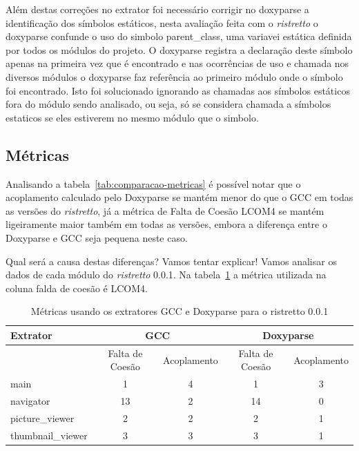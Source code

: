 Além destas correções no extrator foi necessário corrigir no doxyparse a
identificação dos símbolos estáticos, nesta avaliação feita com o {\it ristretto} o
doxyparse confunde o uso do simbolo parent\_class, uma variavei estática
definida por todos os módulos do projeto. O doxyparse registra a declaração
deste símbolo apenas na primeira vez que é encontrado e nas ocorrências de uso
e chamada nos diversos módulos o doxyparse faz referência ao primeiro módulo
onde o símbolo foi encontrado. Isto foi solucionado ignorando as chamadas aos
símbolos estáticos fora do módulo sendo analisado, ou seja, só se considera
chamada a símbolos estaticos se eles estiverem no mesmo módulo que o simbolo.

\subsection{Métricas}

Analisando a tabela~\ref{tab:comparacao-metricas}  é possível notar que o acoplamento calculado pelo Doxyparse
se mantém menor do que o GCC em todas as versões do {\it ristretto}, já a métrica de
Falta de Coesão LCOM4 se mantém ligeiramente maior também em todas as versões,
embora a diferença entre o Doxyparse e GCC seja pequena neste caso.

Qual será a causa destas diferenças? Vamos tentar explicar! Vamos analisar os
dados de cada módulo do {\it ristretto} 0.0.1. Na
tabela~\ref{tab:comparacao-metricas-ristretto-0.0.1} a métrica utilizada na
coluna falda de coesão é LCOM4.

\begin{table}
\caption{Métricas usando os extratores GCC e Doxyparse para o ristretto 0.0.1}
\centering
\begin{tabular}{| l | c c | c c |}
\hline
Extrator          & \multicolumn{2}{|c|}{GCC}        & \multicolumn{2}{|c|}{Doxyparse} \\
\hline
                  & Falta de Coesão & Acoplamento    & Falta de Coesão & Acoplamento   \\
\hline
main              & 1               & 4              & 1               & 3             \\
navigator         & 13              & 2              & 14              & 0             \\
picture\_viewer   & 2               & 2              & 2               & 1             \\
thumbnail\_viewer & 3               & 3              & 3               & 1             \\
\hline
\end{tabular}
\label{tab:comparacao-metricas-ristretto-0.0.1}
\end{table}

